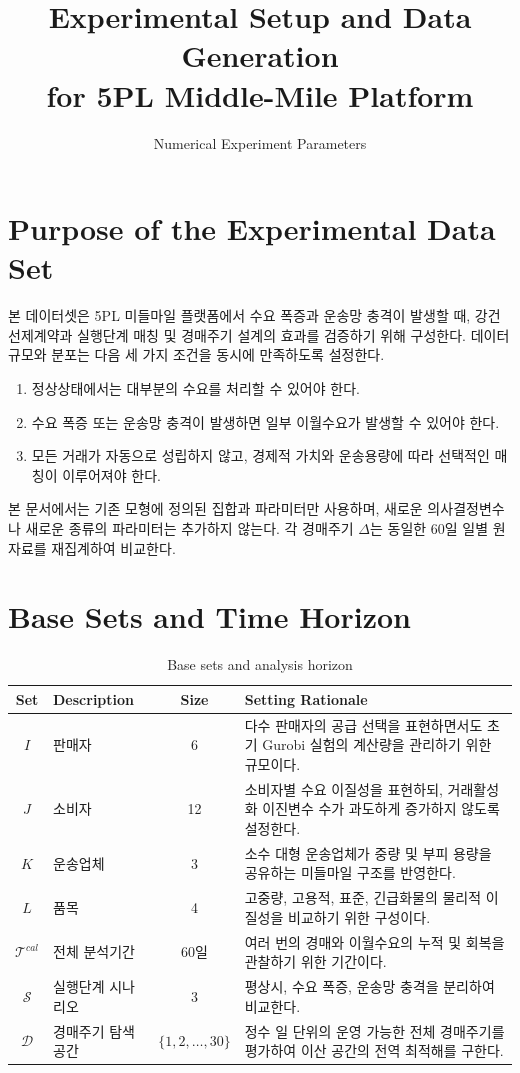 \documentclass[11pt,a4paper]{article}
\title{\textbf{Experimental Setup and Data Generation\\for 5PL Middle-Mile Platform}}
\author{Numerical Experiment Parameters}
\date{}
\begin{document}
\maketitle

\section{Purpose of the Experimental Data Set}
본 데이터셋은 5PL 미들마일 플랫폼에서 수요 폭증과 운송망 충격이 발생할 때, 강건 선제계약과 실행단계 매칭 및 경매주기 설계의 효과를 검증하기 위해 구성한다. 데이터 규모와 분포는 다음 세 가지 조건을 동시에 만족하도록 설정한다.

\begin{enumerate}[label=(\arabic*)]
    \item 정상상태에서는 대부분의 수요를 처리할 수 있어야 한다.
    \item 수요 폭증 또는 운송망 충격이 발생하면 일부 이월수요가 발생할 수 있어야 한다.
    \item 모든 거래가 자동으로 성립하지 않고, 경제적 가치와 운송용량에 따라 선택적인 매칭이 이루어져야 한다.
\end{enumerate}

본 문서에서는 기존 모형에 정의된 집합과 파라미터만 사용하며, 새로운 의사결정변수나 새로운 종류의 파라미터는 추가하지 않는다. 각 경매주기 $\Delta$는 동일한 60일 일별 원자료를 재집계하여 비교한다.

\section{Base Sets and Time Horizon}

\begin{table}[h!]
\centering
\begin{tabularx}{\textwidth}{clcY}
\toprule
\textbf{Set} & \textbf{Description} & \textbf{Size} & \textbf{Setting Rationale} \\
\midrule
$I$ & 판매자 & 6 & 다수 판매자의 공급 선택을 표현하면서도 초기 Gurobi 실험의 계산량을 관리하기 위한 규모이다. \\
$J$ & 소비자 & 12 & 소비자별 수요 이질성을 표현하되, 거래활성화 이진변수 수가 과도하게 증가하지 않도록 설정한다. \\
$K$ & 운송업체 & 3 & 소수 대형 운송업체가 중량 및 부피 용량을 공유하는 미들마일 구조를 반영한다. \\
$L$ & 품목 & 4 & 고중량, 고용적, 표준, 긴급화물의 물리적 이질성을 비교하기 위한 구성이다. \\
$\mathcal{T}^{cal}$ & 전체 분석기간 & 60일 & 여러 번의 경매와 이월수요의 누적 및 회복을 관찰하기 위한 기간이다. \\
$\mathcal{S}$ & 실행단계 시나리오 & 3 & 평상시, 수요 폭증, 운송망 충격을 분리하여 비교한다. \\
$\mathcal{D}$ & 경매주기 탐색공간 & $\{1,2,\ldots,30\}$ & 정수 일 단위의 운영 가능한 전체 경매주기를 평가하여 이산 공간의 전역 최적해를 구한다. \\
\bottomrule
\end{tabularx}
\caption{Base sets and analysis horizon}
\end{table}
\end{document}
